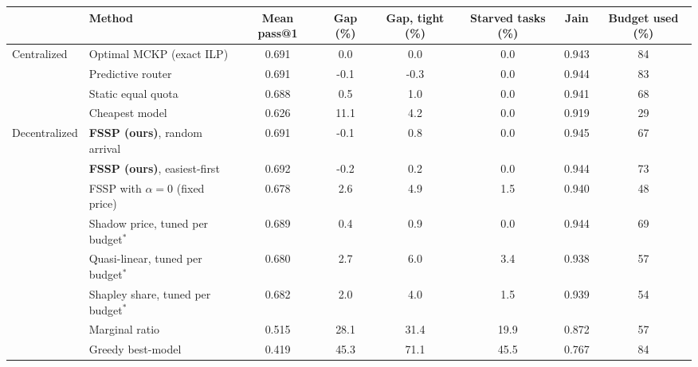 \begin{tabular}{llcccccc}
\toprule
 & Method & Mean pass@1 & Gap (\%) & Gap, tight (\%) & Starved tasks (\%) & Jain & Budget used (\%) \\
\midrule
Centralized & Optimal MCKP (exact ILP) & 0.691 & 0.0 & 0.0 & 0.0 & 0.943 & 84 \\
 & Predictive router & 0.691 & -0.1 & -0.3 & 0.0 & 0.944 & 83 \\
 & Static equal quota & 0.688 & 0.5 & 1.0 & 0.0 & 0.941 & 68 \\
 & Cheapest model & 0.626 & 11.1 & 4.2 & 0.0 & 0.919 & 29 \\
\midrule
Decentralized & \textbf{FSSP (ours)}, random arrival & 0.691 & -0.1 & 0.8 & 0.0 & 0.945 & 67 \\
 & \textbf{FSSP (ours)}, easiest-first & 0.692 & -0.2 & 0.2 & 0.0 & 0.944 & 73 \\
 & FSSP with $\alpha=0$ (fixed price) & 0.678 & 2.6 & 4.9 & 1.5 & 0.940 & 48 \\
 & Shadow price, tuned per budget$^*$ & 0.689 & 0.4 & 0.9 & 0.0 & 0.944 & 69 \\
 & Quasi-linear, tuned per budget$^*$ & 0.680 & 2.7 & 6.0 & 3.4 & 0.938 & 57 \\
 & Shapley share, tuned per budget$^*$ & 0.682 & 2.0 & 4.0 & 1.5 & 0.939 & 54 \\
 & Marginal ratio & 0.515 & 28.1 & 31.4 & 19.9 & 0.872 & 57 \\
 & Greedy best-model & 0.419 & 45.3 & 71.1 & 45.5 & 0.767 & 84 \\
\bottomrule
\end{tabular}